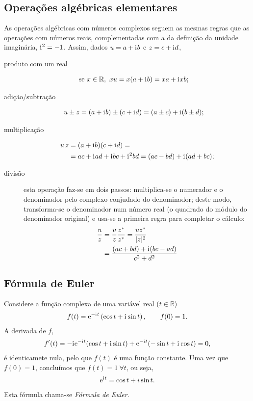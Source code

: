 \subsection{Operações algébricas elementares}
As operações algébricas com números complexos seguem as mesmas regras que as
operações com números reais, complementadas com a da definição da unidade
imaginária, $\text{i}\mkern1mu^2=-1$. Assim, dados $ u=a+\text{i}\mkern1mu b$ e $ z=c+\text{i}\mkern1mu d$,
\begin{description}
  \item[produto com um real]
    \begin{align*}
      \text{se }x\in\mathbb{R},\ x u&=x(a+\text{i}\mkern1mu b)=xa+\text{i}\mkern1mu xb;
    \end{align*}
  \item[adição/subtração] 
    \begin{align*}
       u\pm z &= (a+\text{i}\mkern1mu b)\pm(c+\text{i}\mkern1mu d) = (a\pm c) + \text{i}\mkern1mu(b\pm d);
    \end{align*}
  \item[multiplicação]
    \begin{align*}
       u \,  z &= (a+\text{i}\mkern1mu b)(c+\text{i}\mkern1mu d)=\\
                           &=ac+\text{i}\mkern1mu ad+ \text{i}\mkern1mu bc+\text{i}\mkern1mu^2 bd=(ac-bd)+\text{i}\mkern1mu(ad+bc);
    \end{align*}
  \item [divisão] esta operação faz-se em dois passos: multiplica-se o numerador
    e o denominador pelo complexo conjudado do denominador; deste modo,
    transforma-se o denominador num número real (o quadrado do módulo do
    denominador original) e usa-se a primeira regra para completar o cálculo:
    \begin{align*}
      \frac{ u}{ z} &= 
        \frac{ u}{ z}\frac{ z^*}{ z^*}=
        \frac{ u  z^*}{|z|^2}\\
        &=\frac{(ac+bd)+\text{i}\mkern1mu(bc-ad)}{c^2+d^2}
    \end{align*}
\end{description}

\subsection{Fórmula de Euler}
Considere a função complexa de uma variável real ($t\in\mathbb{R}$)
\begin{equation*}
  f(t) = \text{e}^{-\text{i}\mkern1mu t}\left(\cos t+\text{i}\mkern1mu \sin t\right),\qquad f(0)=1.
\end{equation*}
A derivada de $f$,
\begin{equation*}
  f'(t) = -\text{i}\mkern1mu\text{e}^{-\text{i}\mkern1mu t}(\cos t+\text{i}\mkern1mu \sin t)+
  \text{e}^{-\text{i}\mkern1mu t}(-\sin t+\text{i}\mkern1mu \cos t)=0,
\end{equation*}
é identicamete nula, pelo que $f(t)$ é uma função constante. Uma vez que
$f(0)=1$, concluímos que $f(t)=1\ \forall t$, ou seja,
\begin{equation*}
  \text{e}^{\text{i}\mkern1mu t}=\cos t+i\sin t.
\end{equation*}
Esta fórmula chama-se \emph{Fórmula de Euler}.

